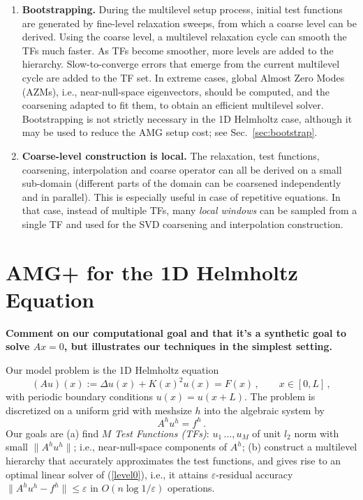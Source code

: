 \documentclass{article}
\begin{document}
\begin{enumerate}
    \item {\bf Bootstrapping.} During the multilevel setup process, initial test functions are generated by fine-level relaxation sweeps, from which a coarse level can be derived. Using the coarse level, a multilevel relaxation cycle can smooth the TFs much faster. As TFs become smoother, more levels are added to the hierarchy. Slow-to-converge errors that emerge from the current multilevel cycle are added to the TF set. In extreme cases, global Almost Zero Modes (AZMs), i.e., near-null-space eigenvectors, should be computed, and the coarsening adapted to fit them, to obtain an efficient multilevel solver. Bootstrapping is not strictly necessary in the 1D Helmholtz case, although it may be used to reduce the AMG setup cost; see Sec.~\ref{sec:bootstrap}.
   \item {\bf Coarse-level construction is local.} The relaxation, test functions, coarsening, interpolation and coarse operator can all be derived on a small sub-domain (different parts of the domain can be coarsened independently and in parallel). This is especially useful in case of repetitive equations. In that case, instead of multiple TFs, many {\it local windows} can be sampled from a single TF and used for the SVD coarsening and interpolation construction. \end{enumerate}

\section{AMG+ for the 1D Helmholtz Equation}
\label{helm_linear}
{\bf Comment on our computational goal and that it's a synthetic goal to solve $A x = 0$, but illustrates our techniques in the simplest setting.}

Our model problem is the 1D Helmholtz equation
\begin{equation}
	\label{helm1d}
	(A u)(x) := \Delta u(x) + K(x)^2 u(x) = F(x)\,,\qquad x \in [0,L]\,,
\end{equation}
with periodic boundary conditions $u(x) = u(x + L)$. 
The problem is discretized on a uniform grid with meshsize $h$ into the algebraic system by
\begin{equation}
	\label{level0}
	A^h u^h = f^h\,.
\end{equation}
Our goals are (a) find $M$ \emph{Test Functions (TFs)}: $u_1\,\dots,u_M$ of unit $l_2$ norm with small $\|A^h u^h\|$; i.e., near-null-space components of $A^h$; (b) construct a multilevel hierarchy that accurately approximates the test functions, and gives rise to an optimal linear solver of (\ref{level0}), i.e., it attains $\varepsilon$-residual accuracy $\|A^h u^h - f^h \| \leq\varepsilon$ in $O(n \log 1/\varepsilon)$ operations.
\end{document}
